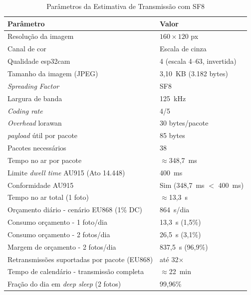 \begin{table}[htbp]
  \centering
  \caption{Parâmetros da Estimativa de Transmissão com SF8}
  \label{tab:parametros}
  \begin{tabular}{ll}
    \toprule
    \textbf{Parâmetro}                                  & \textbf{Valor}              \\
    \midrule
    Resolução da imagem                                 & $160 \times 120$ px         \\
    Canal de cor                                        & Escala de cinza             \\
    Qualidade \gls{esp32cam}                                 & 4 (escala 4--63, invertida) \\
    Tamanho da imagem (JPEG)                            & 3,10~KB (3.182 bytes)       \\
    \textit{Spreading Factor}                           & SF8                         \\
    Largura de banda                                    & 125~kHz                     \\
    \textit{Coding rate}                                & 4/5                         \\
    \textit{Overhead} \gls{lorawan}                           & 30 bytes/pacote             \\
    \textit{\gls{payload}} útil por pacote                    & 85 bytes                    \\
    Pacotes necessários                                 & 38                          \\
    Tempo no ar por pacote                              & $\approx$348,7~ms           \\
    Limite \textit{dwell time} AU915 (Ato 14.448)       & 400~ms                      \\
    Conformidade AU915                                  & Sim (348,7~ms $<$ 400~ms)   \\
    Tempo no ar total (1 foto)                          & $\approx$13,3~s             \\
    Orçamento diário - cenário EU868 (1\% DC)         & 864~s/dia                   \\
    Consumo orçamento - 1 foto/dia                    & 13,3~s (1,5\%)              \\
    Consumo orçamento - 2 fotos/dia                   & 26,5~s (3,1\%)              \\
    Margem de orçamento - 2 fotos/dia                 & 837,5~s (96,9\%)            \\
    Retransmissões suportadas por pacote (EU868)        & até 32$\times$              \\
    Tempo de calendário - transmissão completa        & $\approx$22~min             \\
    Fração do dia em \textit{deep sleep} (2 fotos)      & 99,96\%                     \\
    \bottomrule
  \end{tabular}
\end{table}
 
